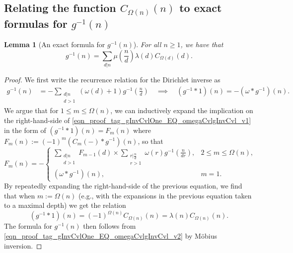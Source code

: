 \documentclass[11pt,reqno,a4letter]{article}
\numberwithin{figure}{section}
\numberwithin{table}{section}
\theoremstyle{plain}
\newtheorem{lemma}[theorem]{Lemma}
\numberwithin{theorem}{section}
\theoremstyle{definition}
\begin{document}
\subsection{Relating the function $C_{\Omega(n)}(n)$ to exact formulas for $g^{-1}(n)$} 
\label{subSection_Relating_CknFuncs_to_gInvn} 

\begin{lemma}[An exact formula for $g^{-1}(n)$] 
\label{lemma_AnExactFormulaFor_gInvByMobiusInv_v1} 
For all $n \geq 1$, we have that 
\[
g^{-1}(n) = \sum_{d|n} \mu\left(\frac{n}{d}\right) \lambda(d) C_{\Omega(d)}(d). 
\]
\end{lemma}
\begin{proof} 
We first write the recurrence relation for the Dirichlet inverse as 
\begin{align} 
\label{eqn_proof_tag_gInvCvlOne_EQ_omegaCvlgInvCvl_v1} 
g^{-1}(n) & = - \sum_{\substack{d|n \\ d>1}} (\omega(d) + 1) g^{-1}\left(\frac{n}{d}\right) 
     \quad\implies\quad 
     (g^{-1} \ast 1)(n) = -(\omega \ast g^{-1})(n). 
\end{align} 
We argue that for $1 \leq m \leq \Omega(n)$, we can inductively expand the 
implication on the right-hand-side of \eqref{eqn_proof_tag_gInvCvlOne_EQ_omegaCvlgInvCvl_v1} 
in the form of $(g^{-1} \ast 1)(n) = F_m(n)$ where 
$F_m(n) := (-1)^{m} (C_m(-) \ast g^{-1})(n)$, so that 
\[
F_m(n) = - 
     \begin{cases} 
     \sum\limits_{\substack{d|n \\ d > 1}} F_{m-1}(d) \times \sum\limits_{\substack{r|\frac{n}{d} \\ r > 1}} 
     \omega(r) g^{-1}\left(\frac{n}{dr}\right), & 2 \leq m \leq \Omega(n), \\ 
     (\omega \ast g^{-1})(n), & m = 1. 
     \end{cases} 
\]
By repeatedly expanding the right-hand-side of the previous equation, 
we find that when $m := \Omega(n)$ (e.g., with the expansions 
in the previous equation taken to a maximal depth) we get the relation 
\begin{equation} 
\label{eqn_proof_tag_gInvCvlOne_EQ_omegaCvlgInvCvl_v2} 
(g^{-1} \ast 1)(n) = (-1)^{\Omega(n)} C_{\Omega(n)}(n) = \lambda(n) C_{\Omega(n)}(n). 
\end{equation} 
The formula for $g^{-1}(n)$ then follows from 
\eqref{eqn_proof_tag_gInvCvlOne_EQ_omegaCvlgInvCvl_v2} 
by M\"obius inversion. 
\end{proof} 
\end{document}

